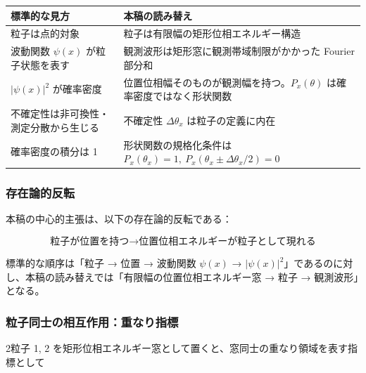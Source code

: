 \documentclass[
]{ltjsarticle}
\newcounter{none} %
\begin{document}
{\def\LTcaptype{none} %
\begin{longtable}[]{@{}
  >{\raggedright\arraybackslash}p{}
  >{\raggedright\arraybackslash}p{}@{}}
\toprule\noalign{}
\begin{minipage}[b]{\linewidth}\raggedright
標準的な見方
\end{minipage} & \begin{minipage}[b]{\linewidth}\raggedright
本稿の読み替え
\end{minipage} \\
\midrule\noalign{}
\endhead
\bottomrule\noalign{}
\endlastfoot
粒子は点的対象 & 粒子は有限幅の矩形位相エネルギー構造 \\
波動関数 \(\psi(x)\) が粒子状態を表す &
観測波形は矩形窓に観測帯域制限がかかった Fourier 部分和 \\
\(\lvert\psi(x)\rvert^2\) が確率密度 &
位置位相幅そのものが観測幅を持つ。\(P_x(\theta)\)
は確率密度ではなく形状関数 \\
不確定性は非可換性・測定分散から生じる & 不確定性 \(\Delta\theta_x\)
は粒子の定義に内在 \\
確率密度の積分は 1 & 形状関数の規格化条件は
\(P_x(\theta_x)=1,\ P_x(\theta_x\pm\Delta\theta_x/2)=0\) \\
\end{longtable}
}

\subsubsection{存在論的反転}\label{ux5b58ux5728ux8ad6ux7684ux53cdux8ee2}

本稿の中心的主張は、以下の存在論的反転である：

\[
\boxed{\text{粒子が位置を持つ} \longrightarrow \text{位置位相エネルギーが粒子として現れる}}
\]

標準的な順序は「粒子 → 位置 → 波動関数 \(\psi(x)\) →
\(|\psi(x)|^2\)」であるのに対し、本稿の読み替えでは「有限幅の位置位相エネルギー窓
→ 粒子 → 観測波形」となる。

\subsubsection{粒子同士の相互作用：重なり指標}\label{ux7c92ux5b50ux540cux58ebux306eux76f8ux4e92ux4f5cux7528ux91cdux306aux308aux6307ux6a19}

2粒子 1, 2
を矩形位相エネルギー窓として置くと、窓同士の重なり領域を表す指標として
\end{document}
